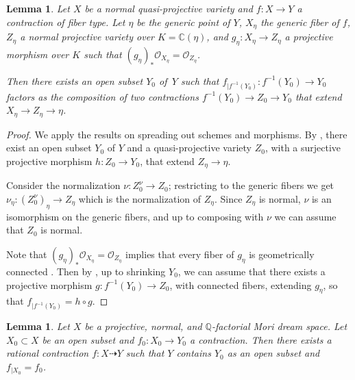 \documentclass[a4paper,12pt]{amsart}
\newtheorem{lemma}[thm]{Lemma}
\theoremstyle{definition}
\numberwithin{figure}{section}
\numberwithin{table}{section}
\newcommand{\ol}{\mathcal{O}}
\newcommand{\Q}{\mathbb{Q}}
\newcommand{\C}{\mathbb{C}}
\begin{document}
\begin{lemma}\label{spread}
  Let $X$ be a normal quasi-projective variety
  and
  $f\colon X\to Y$ a contraction of fiber type. Let  $\eta$ be the generic point of $Y$, $X_{\eta}$ the generic fiber of $f$, $Z_{\eta}$ a normal projective variety over $K=\C(\eta)$, and $g_\eta\colon X_{\eta}\to Z_{\eta}$ a projective morphism  over $K$ such that $(g_\eta)_*\ol_{X_{\eta}}=\ol_{Z_\eta}$. 

  Then there exists   an open subset $Y_0$ of $\,Y$ such that $f_{|f^{-1}(Y_0)}\colon f^{-1}(Y_0)\to Y_0$ factors as the composition of two contractions  $f^{-1}(Y_0)\to Z_0\to Y_0$ that extend $X_\eta\to Z_\eta\to\eta$. 
\end{lemma}
\begin{proof}
  We  apply the results on spreading out schemes and morphisms. By \cite[Th.~3.2.1(i) and (ii)]{poonen}, there exist an open subset $Y_0$ of $Y$ and a quasi-projective variety $Z_0$, with a  surjective projective morphism $h\colon Z_0\to Y_0$, that extend $Z_\eta\to\eta$.

  Consider the 
  normalization $\nu\colon Z_0^{\nu}\to Z_0$; restricting to the generic fibers 
we get $\nu_{\eta}\colon (Z_0^{\nu})_{\eta}\to Z_\eta$ which is the normalization of $Z_\eta$. Since $Z_{\eta}$ is normal, $\nu$ is an isomorphism on the generic fibers, and up to composing with $\nu$ we can assume that $Z_0$ is normal. 

   Note that  $(g_\eta)_*\ol_{X_{\eta}}=\ol_{Z_\eta}$ implies that every fiber of $g_{\eta}$ is geometrically connected \cite[Ch.~5, Th.~3.15 and Cor.~3.17]{liu}.
   Then by \cite[Th.~3.2.1(iii) and (iv)]{poonen},  up to shrinking $Y_0$, we can assume that there exists a projective morphism $g\colon f^{-1}(Y_0)\to Z_0$, with connected fibers, extending  $g_\eta$, so that $f_{|f^{-1}(Y_0)}=h\circ g$.
\end{proof}  
\begin{lemma}\label{elem}
Let $X$ be a projective, normal, and $\Q$-factorial Mori dream space. Let $X_0\subset X$ be an open subset and $f_0\colon X_0\to Y_0$ a contraction. Then there exists a rational contraction $f\colon X\dasharrow Y$ such that $Y$ contains $Y_0$ as an open subset and $f_{|X_0}=f_0$.
\end{lemma}
\end{document}
